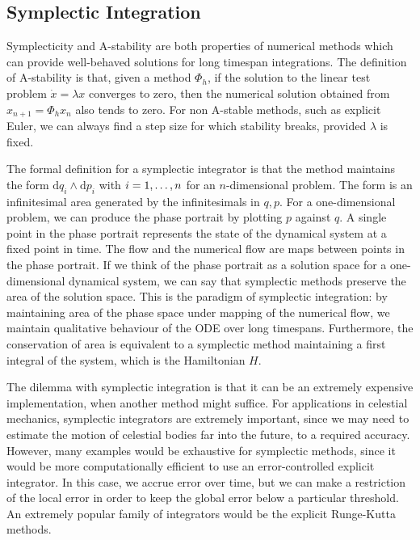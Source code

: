 \documentclass{report}
\theoremstyle{exampstyle} \newtheorem{example}[theorem]{Example}
\theoremstyle{exampstyle} \newtheorem{remark}[theorem]{Remark}
\theoremstyle{exampstyle} \newtheorem{definition}[theorem]{Definition}
\theoremstyle{exampstyle} \newtheorem{lemma}[theorem]{Lemma}
\begin{document}
\subsection{Symplectic Integration}

Symplecticity and A-stability are both properties of numerical methods which can provide well-behaved solutions for long timespan integrations.
The definition of A-stability is that, given a method $\Phi_h$,
if the solution to the linear test problem $\dot{x} = \lambda x$ converges to zero,
then the numerical solution obtained from $x_{n+1} = \Phi_h x_n$ also tends to zero.
For non A-stable methods, such as explicit Euler, we can always find a step size for which stability breaks,
provided $\lambda$ is fixed.

The formal definition for a symplectic integrator is that the method maintains the form $\mathrm{d}q_i \wedge \mathrm{d}p_i$ with $i = 1, \mathellipsis, n$ for an $n$-dimensional problem.
The form is an infinitesimal area generated by the infinitesimals in $q, p$.
For a one-dimensional problem, we can produce the phase portrait by plotting $p$ against $q$.
A single point in the phase portrait represents the state of the dynamical system at a fixed point in time.
The flow and the numerical flow are maps between points in the phase portrait.
If we think of the phase portrait as a solution space for a one-dimensional dynamical system, we can say that symplectic methods preserve the area of the solution space.
This is the paradigm of symplectic integration: by maintaining area of the phase space under mapping of the numerical flow, we maintain qualitative behaviour of the ODE over long timespans.
Furthermore, the conservation of area is equivalent to a symplectic method maintaining a first integral of the system, which is the Hamiltonian $H$.


The dilemma with symplectic integration is that it can be an extremely expensive implementation, when another method might suffice.
For applications in celestial mechanics, symplectic integrators are extremely important, since we may need to estimate the motion of celestial bodies far into the future, to a required accuracy.
However, many examples would be exhaustive for symplectic methods, since it would be more computationally efficient to use an error-controlled explicit integrator.
In this case, we accrue error over time, but we can make a restriction of the local error in order to keep the global error below a particular threshold.
An extremely popular family of integrators would be the explicit Runge-Kutta methods.
\end{document}
